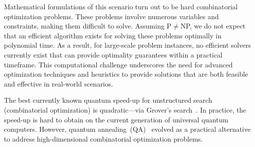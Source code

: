 \documentclass[conference]{IEEEtran}
\begin{document}
Mathematical formulations of this scenario turn out to be hard combinatorial optimization problems. 
These problems involve numerous variables and constraints, making them difficult to solve. 
Assuming P$\not =$NP, we do not expect that an efficient algorithm exists for solving 
these problems optimally in polynomial time. As a result, for large-scale problem instances, no 
efficient solvers currently exist that can provide optimality guarantees within a practical timeframe. 
This computational challenge underscores the need for advanced optimization techniques and heuristics 
to provide solutions that are both feasible and effective in real-world scenarios. 

The best currently known quantum speed-up for unstructured search (combinatorial optimization) 
is quadratic---via Grover's search~\cite{grover96search,grover2025amplify}. 
In practice, the speed-up is hard to obtain on the current generation of universal 
quantum computers. However, 
quantum annealing~(QA)~\cite{farhi2000quantumcomputationadiabaticevolution} evolved as a 
practical alternative to address high-dimensional 
combinatorial optimization problems. 


\end{document}
